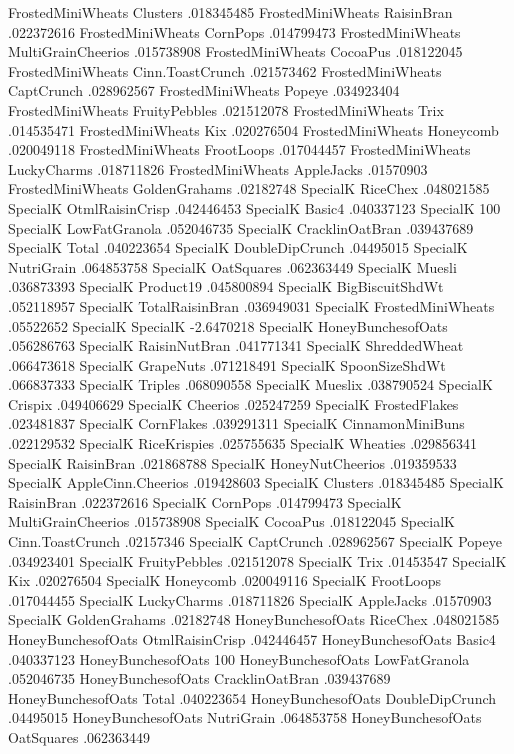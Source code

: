 FrostedMiniWheats	Clusters	.018345485
FrostedMiniWheats	RaisinBran	.022372616
FrostedMiniWheats	CornPops	.014799473
FrostedMiniWheats	MultiGrainCheerios	.015738908
FrostedMiniWheats	CocoaPus	.018122045
FrostedMiniWheats	Cinn.ToastCrunch	.021573462
FrostedMiniWheats	CaptCrunch	.028962567
FrostedMiniWheats	Popeye	.034923404
FrostedMiniWheats	FruityPebbles	.021512078
FrostedMiniWheats	Trix	.014535471
FrostedMiniWheats	Kix	.020276504
FrostedMiniWheats	Honeycomb	.020049118
FrostedMiniWheats	FrootLoops	.017044457
FrostedMiniWheats	LuckyCharms	.018711826
FrostedMiniWheats	AppleJacks	.01570903
FrostedMiniWheats	GoldenGrahams	.02182748
SpecialK	RiceChex	.048021585
SpecialK	OtmlRaisinCrisp	.042446453
SpecialK	Basic4	.040337123
SpecialK	100%
SpecialK	LowFatGranola	.052046735
SpecialK	CracklinOatBran	.039437689
SpecialK	Total	.040223654
SpecialK	DoubleDipCrunch	.04495015
SpecialK	NutriGrain	.064853758
SpecialK	OatSquares	.062363449
SpecialK	Muesli	.036873393
SpecialK	Product19	.045800894
SpecialK	BigBiscuitShdWt	.052118957
SpecialK	TotalRaisinBran	.036949031
SpecialK	FrostedMiniWheats	.05522652
SpecialK	SpecialK	-2.6470218
SpecialK	HoneyBunchesofOats	.056286763
SpecialK	RaisinNutBran	.041771341
SpecialK	ShreddedWheat	.066473618
SpecialK	GrapeNuts	.071218491
SpecialK	SpoonSizeShdWt	.066837333
SpecialK	Triples	.068090558
SpecialK	Mueslix	.038790524
SpecialK	Crispix	.049406629
SpecialK	Cheerios	.025247259
SpecialK	FrostedFlakes	.023481837
SpecialK	CornFlakes	.039291311
SpecialK	CinnamonMiniBuns	.022129532
SpecialK	RiceKrispies	.025755635
SpecialK	Wheaties	.029856341
SpecialK	RaisinBran	.021868788
SpecialK	HoneyNutCheerios	.019359533
SpecialK	AppleCinn.Cheerios	.019428603
SpecialK	Clusters	.018345485
SpecialK	RaisinBran	.022372616
SpecialK	CornPops	.014799473
SpecialK	MultiGrainCheerios	.015738908
SpecialK	CocoaPus	.018122045
SpecialK	Cinn.ToastCrunch	.02157346
SpecialK	CaptCrunch	.028962567
SpecialK	Popeye	.034923401
SpecialK	FruityPebbles	.021512078
SpecialK	Trix	.01453547
SpecialK	Kix	.020276504
SpecialK	Honeycomb	.020049116
SpecialK	FrootLoops	.017044455
SpecialK	LuckyCharms	.018711826
SpecialK	AppleJacks	.01570903
SpecialK	GoldenGrahams	.02182748
HoneyBunchesofOats	RiceChex	.048021585
HoneyBunchesofOats	OtmlRaisinCrisp	.042446457
HoneyBunchesofOats	Basic4	.040337123
HoneyBunchesofOats	100%
HoneyBunchesofOats	LowFatGranola	.052046735
HoneyBunchesofOats	CracklinOatBran	.039437689
HoneyBunchesofOats	Total	.040223654
HoneyBunchesofOats	DoubleDipCrunch	.04495015
HoneyBunchesofOats	NutriGrain	.064853758
HoneyBunchesofOats	OatSquares	.062363449
